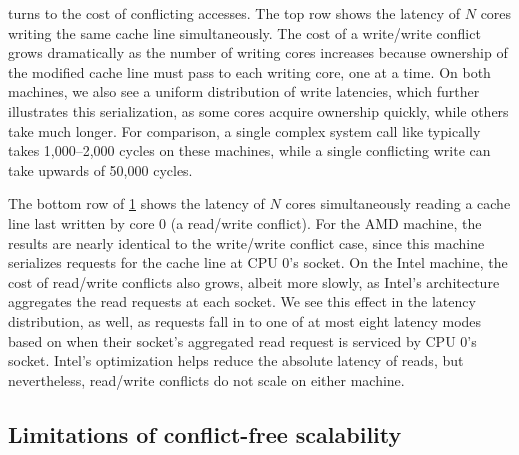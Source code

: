 \begin{figure}
  \centering
  \label{fig:conflict-cycles}
\end{figure}

 turns to the cost of conflicting
accesses.  The top row shows the latency of $N$ cores writing the same
cache line simultaneously.  The cost of a write/write conflict grows
dramatically as the number of writing cores increases because
ownership of the modified cache line must pass to each writing
core, one at a time.  On both machines, we also see a uniform
distribution of write latencies, which further illustrates this
serialization, as some cores acquire ownership quickly, while others
take much longer.
%
For comparison, a single complex system call like 
typically takes 1,000--2,000 cycles on these machines, while a single
conflicting write can take upwards of 50,000 cycles.

The bottom row of \cref{fig:conflict-cycles} shows the latency of $N$
cores simultaneously reading a cache line last written by core 0 (a
read/write conflict).  For the AMD machine, the results are nearly
identical to the write/write conflict case, since this machine
serializes requests for the cache line at CPU 0's socket.  On the
Intel machine, the cost of read/write conflicts also grows, albeit
more slowly, as Intel's architecture aggregates the read requests at
each socket.
%
We see this effect in the latency distribution, as well, as requests
fall in to one of at most eight latency modes based on when their
socket's aggregated read request is serviced by CPU 0's socket.
Intel's optimization helps reduce the absolute
latency of reads, but nevertheless, read/write conflicts do not scale
on either machine.


\subsection{Limitations of conflict-free scalability}
\label{sec:scalability:limits}

